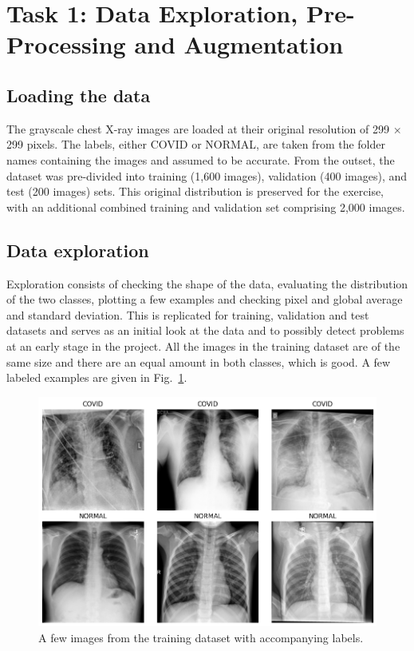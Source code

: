 \documentclass[conference]{IEEEtran}
\begin{document}
\vspace{1cm}
\section{Task 1: Data Exploration, Pre-Processing and Augmentation}\label{sec:task_1}
\subsection{Loading the data}
The grayscale chest X-ray images are loaded at their original resolution of 299 × 299 pixels. The labels, either COVID or NORMAL, are taken from the folder names containing the images and assumed to be accurate. From the outset, the dataset was pre-divided into training (1,600 images), validation (400 images), and test (200 images) sets. This original distribution is preserved for the exercise, with an additional combined training and validation set comprising 2,000 images.

\subsection{Data exploration}
Exploration consists of checking the shape of the data, evaluating the distribution of the two classes, plotting a few examples and checking pixel and global average and standard deviation. This is replicated for training, validation and test datasets and serves as an initial look at the data and to possibly detect problems at an early stage in the project.
All the images in the training dataset are of the same size and there are an equal amount in both classes, which is good. A few labeled examples are given in Fig.~\ref{fig:example_images}.

\begin{figure}[htbp]
\centerline{\includegraphics[width=\linewidth]{Images/example_images.png}}
\caption{A few images from the training dataset with accompanying labels.}
\label{fig:example_images}
\end{figure}
\end{document}
